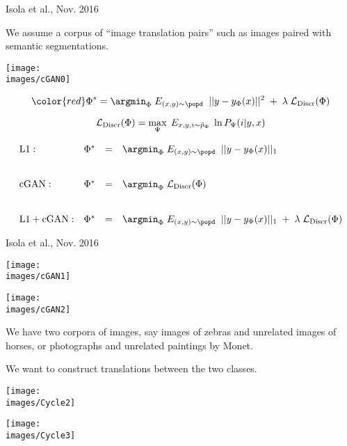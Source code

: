 {
{Isola et al., Nov. 2016}

We assume a corpus of ``image translation pairs'' such as images paired with semantic segmentations.

\centerline{\texttt{[image: \\images/cGAN0]}}



$${\color{red} \Phi^* = \argmin_\Phi\;E_{(x,y) \sim \popd}\;\; ||y- y_\Phi(x)||^2\; + \; \lambda\; {\cal L}_{\mathrm{Discr}}(\Phi)}$$

\vfill
$${\cal L}_\mathrm{Discr}(\Phi) = \max_\Psi \;E_{x,y,i \sim \tilde{p}_\Phi}\; \ln P_\Psi(i|y,x)$$


{\huge
$$\begin{array}{lrcl}
\mathrm{L1:} & \Phi^* & = & \argmin_\Phi\;E_{(x,y) \sim \popd}\;\; ||y - y_\Phi(x)||_1 \\
\\
\\
\mathrm{cGAN:} & \Phi^* & = & \argmin_\Phi\;{\cal L}_{\mathrm{Discr}}(\Phi) \\
\\
\\
\mathrm{L1 + cGAN:} & \Phi^* & = & \argmin_\Phi\;E_{(x,y) \sim \popd}\;\; ||y - y_\Phi(x)||_1\; +\; \lambda\; {\cal L}_\mathrm{Discr}(\Phi)
\end{array}$$
}


{Isola et al., Nov. 2016}

\centerline{\texttt{[image: \\images/cGAN1]}}


\centerline{\texttt{[image: \\images/cGAN2]}}


We have two corpora of images, say images of zebras and unrelated images of horses, or photographs and unrelated paintings by Monet.

\vfill
We want to construct translations between the two classes.

\centerline{\texttt{[image: \\images/Cycle2]}}


\centerline{\texttt{[image: \\images/Cycle3]}}

}
